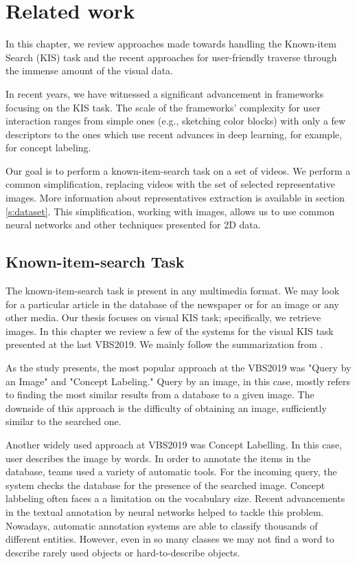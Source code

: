 \chapter{Related work}
\label{ch:related_work}


In this chapter, we review approaches made towards handling the Known-item Search (KIS) task and the recent approaches for user-friendly traverse through the immense amount of the visual data.

In recent years, we have witnessed a significant advancement in frameworks focusing on the KIS task. The scale of the frameworks' complexity for user interaction ranges from simple ones (e.g., sketching color blocks) with only a few descriptors to the ones which use recent advances in deep learning, for example, for concept labeling.

Our goal is to perform a known-item-search task on a set of videos. We perform a common simplification, replacing videos with the set of selected representative images. More information about representatives extraction is available in section \ref{s:dataset}. This simplification, working with images, allows us to use common neural networks and other techniques presented for 2D data.

\section{Known-item-search Task}

The known-item-search task is present in any multimedia format. We may look for a particular article in the database of the newspaper or for an image or any other media. Our thesis focuses on visual KIS task; specifically, we retrieve images. In this chapter we review a few of the systems for the visual KIS task presented at the last VBS2019. We mainly follow the summarization from \cite{rossetto2020interactive}.

As the study presents, the most popular approach at the VBS2019 was "Query by an Image" and "Concept Labeling." Query by an image, in this case, mostly refers to finding the most similar results from a database to a given image. The downside of this approach is the difficulty of obtaining an image, sufficiently similar to the searched one.

Another widely used approach at VBS2019 was Concept Labelling. In this case, user describes the image by words. In order to annotate the items in the database, teams used a variety of automatic tools. For the incoming query, the system checks the database for the presence of the searched image. Concept labbeling often faces a a limitation on the vocabulary size. Recent advancements in the textual annotation by neural networks helped to tackle this problem. Nowadays, automatic annotation systems are able to classify thousands of different entities. However, even in so many classes we may not find a word to describe rarely used objects or hard-to-describe objects.

